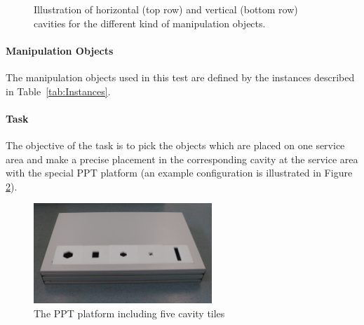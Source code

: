 \begin{figure} [h!]
\begin{center}
 \hspace{0.1cm}
  \hspace{0.1cm}
  \hspace{0.1cm}
\end{center}
\caption{Illustration of horizontal (top row) and vertical (bottom row) cavities for the different kind of manipulation objects.}
\label{fig:ppt_tiles}
\end{figure}


\paragraph{Manipulation Objects}
The manipulation objects used in this test are defined by the instances described in Table~\ref{tab:Instances}.

\paragraph{Task}
 The objective of the task is to pick the objects which are placed on one service area and make a precise placement in the corresponding cavity at the service area with the special PPT platform (an example configuration is illustrated in Figure \ref{fig:ppt_plattform}). 

\begin{figure}
\centering
\includegraphics[width=0.6\textwidth ]{./images/ppt_plattform.jpg}
\caption{The PPT platform including five cavity tiles}
\label{fig:ppt_plattform}
\end{figure}

